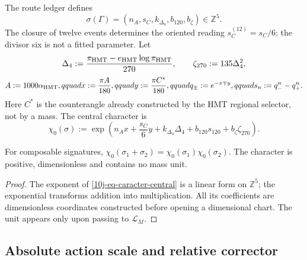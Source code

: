 \begin{definition}
\label{10j-def-firma-caracter}
The route ledger defines
\begin{equation}
 \sigma(\Gamma)=
 (n_A,s_C,k_{\Delta_4},b_{120},b_\zeta)\in\mathbb Z^5.
 \label{10j-eq-firma-z5}
\end{equation}
The closure of twelve events determines the oriented reading \(s_C^{(12)}=s_C/6\); the divisor six is not a fitted parameter. Let
\begin{equation}
 \Delta_4:=
 \frac{\pi_{\rm HMT}-e_{\rm HMT}\log\pi_{\rm HMT}}{270},
 \qquad \zeta_{270}:=135\Delta_4^2,
 \label{10j-eq-delta-zeta}
\end{equation}
\begin{equation}
 A:=1000\alpha_{\rm HMT},qquad
 x:=\frac{\pi A}{180},qquad
 y:=\frac{\pi C^*}{180},qquad
 q_\pm:=e^{-x\mp y},qquad
 s_n:=q_-^n-q_+^n .
 \label{10j-eq-canales}
\end{equation}
Here \(C^*\) is the counterangle already constructed by the HMT regional selector, not by a mass. The central character is
\begin{equation}
 \chi_0(\sigma):=
 \exp\!\left(
 n_Ax+\frac{s_C}{6}y+k_{\Delta_4}\Delta_4
 +b_{120}s_{120}+b_\zeta\zeta_{270}
 \right).
 \label{10j-eq-caracter-central}
\end{equation}
\end{definition}

\begin{lemma}
\label{10j-lem-caracter}
For composable signatures, \(
 \chi_0(\sigma_1+\sigma_2)=\chi_0(\sigma_1)\chi_0(\sigma_2)
\). The character is positive, dimensionless and contains no mass unit.
\end{lemma}

\begin{proof}
The exponent of \eqref{10j-eq-caracter-central} is a linear form on \(\mathbb Z^5\); the exponential transforms addition into multiplication. All its coefficients are dimensionless coordinates constructed before opening a dimensional chart. The unit appears only upon passing to \(\mathcal L_M\).
\end{proof}

\subsection{Absolute action scale and relative corrector}

